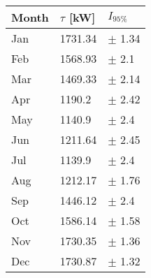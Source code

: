 \begin{tabular}{lll}
\toprule
Month & $\tau$ [kW] &   $I_{95\%}$ \\
\midrule
  Jan &     1731.34 &   $\pm$ 1.34 \\
  Feb &     1568.93 &    $\pm$ 2.1 \\
  Mar &     1469.33 &   $\pm$ 2.14 \\
  Apr &      1190.2 &   $\pm$ 2.42 \\
  May &      1140.9 &    $\pm$ 2.4 \\
  Jun &     1211.64 &   $\pm$ 2.45 \\
  Jul &      1139.9 &    $\pm$ 2.4 \\
  Aug &     1212.17 &   $\pm$ 1.76 \\
  Sep &     1446.12 &    $\pm$ 2.4 \\
  Oct &     1586.14 &   $\pm$ 1.58 \\
  Nov &     1730.35 &   $\pm$ 1.36 \\
  Dec &     1730.87 &   $\pm$ 1.32 \\
\bottomrule
\end{tabular}
